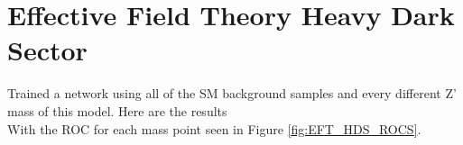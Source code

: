 \documentclass[14pt, a4paper]{book}
\begin{document}
\newpage
\section{Effective Field Theory Heavy Dark Sector}Trained a network using all of the SM background samples and every different Z' mass of this model. Here are the results
\\With the ROC for each mass point seen in Figure \ref{fig:EFT_HDS_ROCS}.
\end{document}
